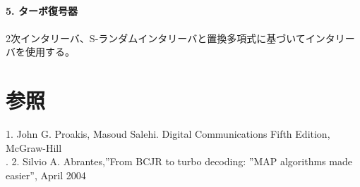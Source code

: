 \documentclass[20 pts]{article}
\begin{document}
\paragraph{5. ターボ復号器}\paragraph{}
2次インタリーバ、S-ランダムインタリーバと置換多項式に基づいてインタリーバを使用する。
\section{参照}
1. John G. Proakis, Masoud Salehi. Digital Communications Fifth Edition, McGraw-Hill\\.
2. Silvio A. Abrantes,''From BCJR to turbo decoding: ''MAP algorithms made easier'', April 2004
\end{document}
